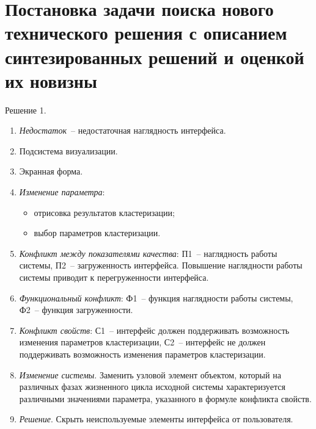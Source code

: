 \chapter{Постановка задачи поиска нового технического решения с
  описанием синтезированных решений и оценкой их новизны}
Решение 1.
\begin{enumerate}
  \item \emph{Недостаток}~-- недостаточная наглядность интерфейса.
  \item Подсистема визуализации.
  \item Экранная форма.
  \item \emph{Изменение параметра}:
    \begin{itemize}
      \item отрисовка результатов кластеризации;
      \item выбор параметров кластеризации.
    \end{itemize}
  \item \emph{Конфликт между показателями качества}: П1~-- наглядность работы
    системы, П2~-- загруженность интерфейса. Повышение наглядности работы
    системы приводит к перегруженности интерфейса.
  \item \emph{Функциональный конфликт}: Ф1~-- функция наглядности работы
    системы, Ф2~-- функция загруженности.
  \item \emph{Конфликт свойств}: С1~-- интерфейс должен поддерживать
    возможность изменения параметров кластеризации, С2~-- интерфейс не должен
    поддерживать возможность изменения параметров кластеризации.
  \item \emph{Изменение системы}. Заменить узловой элемент объектом, который на
    различных фазах жизненного цикла исходной системы характеризуется
    различными значениями параметра, указанного в формуле конфликта свойств.
  \item \emph{Решение}. Скрыть неиспользуемые элементы интерфейса от
    пользователя.
\end{enumerate}

\newpage


